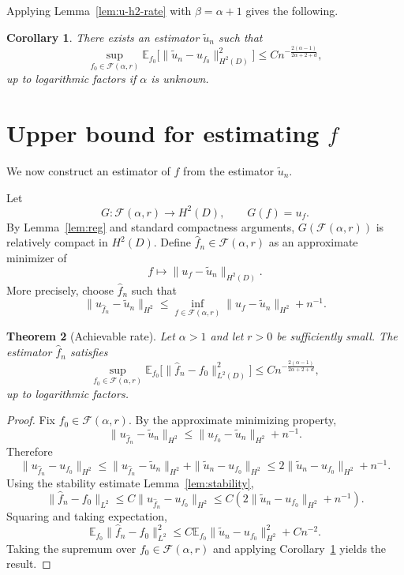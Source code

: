 \documentclass[11pt]{article}
\theoremstyle{plain}
\newtheorem{theorem}{Theorem}
\newtheorem{corollary}[theorem]{Corollary}
\theoremstyle{definition}
\newcommand{\E}{\mathbb E}
\newcommand{\1}{\mathbf 1}
\newcommand{\F}{\mathcal F}
\begin{document}
Applying Lemma~\ref{lem:u-h2-rate} with \(\beta=\alpha+1\) gives the following.

\begin{corollary}
\label{cor:u-h2}
There exists an estimator \(\tilde u_n\) such that
\[
\sup_{f_0\in\F(\alpha,r)}
\E_{f_0}\bigl[\|\tilde u_n-u_{f_0}\|_{H^2(D)}^2\bigr]
\le
C n^{-\frac{2(\alpha-1)}{2\alpha+2+d}},
\]
up to logarithmic factors if \(\alpha\) is unknown.
\end{corollary}

\section{Upper bound for estimating \(f\)}

We now construct an estimator of \(f\) from the estimator \(\tilde u_n\).

Let
\[
G:\F(\alpha,r)\to H^2(D),\qquad G(f)=u_f.
\]
By Lemma~\ref{lem:reg} and standard compactness arguments, \(G(\F(\alpha,r))\) is relatively compact in \(H^2(D)\). Define \(\hat f_n\in\F(\alpha,r)\) as an approximate minimizer of
\[
f\mapsto \|u_f-\tilde u_n\|_{H^2(D)}.
\]
More precisely, choose \(\hat f_n\) such that
\[
\|u_{\hat f_n}-\tilde u_n\|_{H^2}
\le
\inf_{f\in\F(\alpha,r)}\|u_f-\tilde u_n\|_{H^2}
+ n^{-1}.
\]

\begin{theorem}[Achievable rate]
\label{thm:upper}
Let \(\alpha>1\) and let \(r>0\) be sufficiently small. The estimator \(\hat f_n\) satisfies
\[
\sup_{f_0\in\F(\alpha,r)}
\E_{f_0}\bigl[\|\hat f_n-f_0\|_{L^2(D)}^2\bigr]
\le
C n^{-\frac{2(\alpha-1)}{2\alpha+2+d}},
\]
up to logarithmic factors.
\end{theorem}

\begin{proof}
Fix \(f_0\in\F(\alpha,r)\). By the approximate minimizing property,
\[
\|u_{\hat f_n}-\tilde u_n\|_{H^2}
\le
\|u_{f_0}-\tilde u_n\|_{H^2}+n^{-1}.
\]
Therefore
\[
\|u_{\hat f_n}-u_{f_0}\|_{H^2}
\le
\|u_{\hat f_n}-\tilde u_n\|_{H^2}
+
\|\tilde u_n-u_{f_0}\|_{H^2}
\le
2\|\tilde u_n-u_{f_0}\|_{H^2}+n^{-1}.
\]
Using the stability estimate Lemma~\ref{lem:stability},
\[
\|\hat f_n-f_0\|_{L^2}
\le
C\|u_{\hat f_n}-u_{f_0}\|_{H^2}
\le
C\left(2\|\tilde u_n-u_{f_0}\|_{H^2}+n^{-1}\right).
\]
Squaring and taking expectation,
\[
\E_{f_0}\|\hat f_n-f_0\|_{L^2}^2
\le
C\E_{f_0}\|\tilde u_n-u_{f_0}\|_{H^2}^2
+
C n^{-2}.
\]
Taking the supremum over \(f_0\in\F(\alpha,r)\) and applying Corollary~\ref{cor:u-h2} yields the result.
\end{proof}
\end{document}
